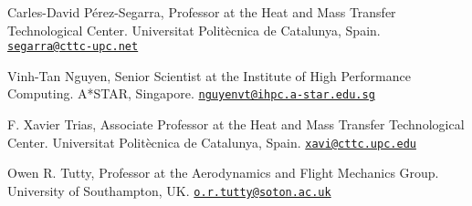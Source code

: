 \documentclass[line]{res}
\newenvironment{p1}
  {\begin{adjustwidth}{-16pt}{0pt}
  \vspace{1pt}}
  {\end{adjustwidth}}
\begin{document}
\begin{resume}
\begin{p1}
Carles-David P\'{e}rez-Segarra, Professor at the Heat and Mass Transfer Technological Center.\newline
Universitat Polit\`{e}cnica de Catalunya, Spain.\newline
\href{mailto:segarra@cttc-upc.net}{\texttt{segarra@cttc-upc.net}}

Vinh-Tan Nguyen, Senior Scientist at the Institute of High Performance Computing.\newline
A*STAR, Singapore.\newline
\href{mailto:nguyenvt@ihpc.a-star.edu.sg}{\texttt{nguyenvt@ihpc.a-star.edu.sg}}

F. Xavier Trias, Associate Professor at the Heat and Mass Transfer Technological Center.\newline
Universitat Polit\`{e}cnica de Catalunya, Spain.\newline
\href{mailto:xavi@cttc.upc.edu}{\texttt{xavi@cttc.upc.edu}}

Owen R. Tutty, Professor at the Aerodynamics and Flight Mechanics Group.\newline
University of Southampton, UK.\newline
\href{mailto:o.r.tutty@soton.ac.uk}{\texttt{o.r.tutty@soton.ac.uk}}
\end{p1}
\end{resume}
\end{document}
